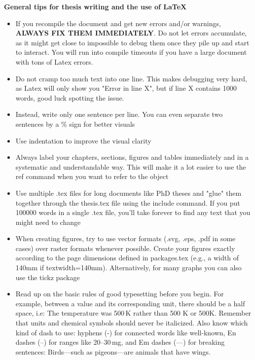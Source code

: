     \textbf{General tips for thesis writing and the use of \LaTeX}
    \begin{itemize}
        \item If you recompile the document and get new errors and/or warnings, \textbf{ALWAYS FIX THEM IMMEDIATELY}. Do not let errors accumulate, as it might get close to impossible to debug them once they pile up and start to interact. You will run into compile timeouts if you have a large document with tons of Latex errors.
        \item Do not cramp too much text into one line. This makes debugging very hard, as Latex will only show you "Error in line X", but if line X contains 1000 words, good luck spotting the issue.
        \item Instead, write only one sentence per line. You can even separate two sentences by a \% sign for better visuals
        \item Use indentation to improve the visual clarity
        \item Always label your chapters, sections, figures and tables immediately and in a systematic and understandable way. This will make it a lot easier to use the ref command when you want to refer to the object
        \item Use multiple .tex files for long documents like PhD theses and "glue" them together through the thesis.tex file using the include command. If you put 100000 words in a single .tex file, you'll take forever to find any text that you might need to change
        \item When creating figures, try to use vector formats (.svg, .eps, .pdf in some cases) over raster formats whenever possible. Create your figures exactly according to the page dimensions defined in packages.tex (e.g., a width of 140mm if textwidth=140mm). Alternatively, for many graphs you can also use the tickz package
        \item Read up on the basic rules of good typesetting before you begin. For example, between a value and its corresponding unit, there should be a half space, i.e: The temperature was 500\,K rather than 500 K or 500K. Remember that units and chemical symbols should never be italicized. Also know which kind of dash to use: hyphens (-) for connected words like well-known, En dashes (--) for ranges like 20--30\,mg, and Em dashes (---) for breaking sentences: Birds---such as pigeons---are animals that have wings.
    \end{itemize}